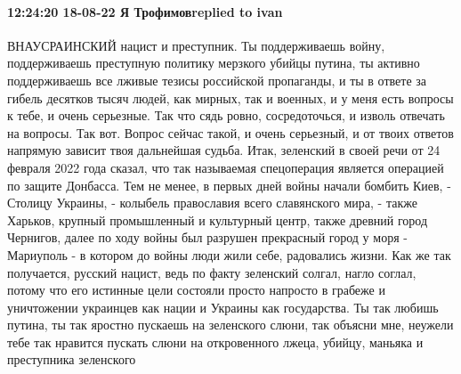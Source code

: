  
 
 
 
 

\paragraph{12:24:20 18-08-22 Я Трофимовreplied to ivan}

ВНАУСРАИНСКИЙ нацист и преступник. Ты поддерживаешь войну, поддерживаешь преступную
политику мерзкого убийцы путина, ты активно поддерживаешь все лживые тезисы
российской пропаганды, и ты в ответе за гибель десятков тысяч людей, как мирных, так и
военных, и у меня есть вопросы к тебе, и очень серьезные. Так что сядь ровно,
сосредоточься, и изволь отвечать на вопросы. Так вот. Вопрос сейчас такой, и
очень серьезный, и от твоих ответов напрямую зависит твоя дальнейшая судьба.
Итак, зеленский в своей речи от 24 февраля 2022 года сказал, что так называемая
спецоперация является операцией по защите Донбасса. Тем не менее, в первых дней
войны начали бомбить Киев, - Столицу Украины, - колыбель православия всего
славянского мира, - также Харьков, крупный промышленный и культурный центр,
также древний город Чернигов, далее по ходу войны был разрушен прекрасный
город у моря - Мариуполь - в котором до войны люди жили себе, радовались
жизни. Как же так получается, русский нацист, ведь по факту зеленский солгал,
нагло соглал, потому что его истинные цели состояли просто напросто в грабеже и
уничтожении украинцев как нации и Украины как государства. Ты так любишь путина,
ты так яростно пускаешь на зеленского слюни, так объясни мне, неужели тебе так
нравится пускать слюни на откровенного лжеца, убийцу, маньяка и преступника
зеленского
